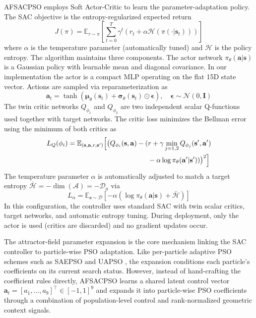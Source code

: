 \documentclass[final,5p,times]{elsarticle}
\newcommand{\symActiondim}{\mathcal{D}_a}
\newcommand{\symGamma}{\gamma}
\begin{document}
AFSACPSO employs Soft Actor-Critic \cite{Haarnoja2018Soft} to learn the parameter-adaptation policy.
The SAC objective is the entropy-regularized expected return
\begin{equation}
J(\pi) = \mathbb{E}_{\tau \sim \pi}\left[\sum_{t=0}^{T} \gamma^t \left(r_t + \alpha \mathcal{H}(\pi(\cdot|\mathbf{s}_t))\right)\right]
\label{eq:sac_objective}
\end{equation} where $\alpha$ is the temperature parameter (automatically tuned) and $\mathcal{H}$ is the policy entropy.
The algorithm maintains three components. The actor network $\pi_\theta(\mathbf{a}|\mathbf{s})$ is a Gaussian policy with learnable mean and diagonal covariance. In our implementation the actor is a compact MLP operating on the flat 15D state vector. Actions are sampled via reparameterization as
\begin{equation}
\mathbf{a}_t = \tanh(\boldsymbol{\mu}_\theta(\mathbf{s}_t) + \boldsymbol{\sigma}_\theta(\mathbf{s}_t) \odot \boldsymbol{\epsilon}), \quad \boldsymbol{\epsilon} \sim \mathcal{N}(0, \mathbf{I})
\end{equation} The twin critic networks $Q_{\phi_1}$ and $Q_{\phi_2}$ are two independent scalar Q-functions used together with target networks. The critic loss minimizes the Bellman error using the minimum of both critics as
\begin{equation}
\begin{aligned}
L_Q(\phi_i) = \mathbb{E}_{(\mathbf{s},\mathbf{a},r,\mathbf{s}')} \Bigl[ \bigl(Q_{\phi_i}(\mathbf{s}, \mathbf{a}) - (&r + \symGamma \min_{j=1,2} Q_{\phi_j}(\mathbf{s}', \mathbf{a}') \\
&- \alpha \log \pi_\theta(\mathbf{a}'|\mathbf{s}') )\bigr)^2 \Bigr]
\end{aligned}
\end{equation} The temperature parameter $\alpha$ is automatically adjusted to match a target entropy $\bar{\mathcal{H}} = -\dim(\mathcal{A}) = -\symActiondim$ via
\begin{equation}
L_\alpha = \mathbb{E}_{\mathbf{s} \sim \mathcal{D}}\left[-\alpha \left(\log \pi_\theta(\mathbf{a}|\mathbf{s}) + \bar{\mathcal{H}}\right)\right]
\end{equation} In this configuration, the controller uses standard SAC with twin scalar critics, target networks, and automatic entropy tuning.
During deployment, only the actor is used (critics are discarded) and no gradient updates occur.

The attractor-field parameter expansion is the core mechanism linking the SAC controller to particle-wise PSO adaptation.
Like per-particle adaptive PSO schemes such as SAEPSO and UAPSO \cite{Liu2025A, Isiet2019Selfadapting}, the expansion conditions each particle's coefficients on its current search status.
However, instead of hand-crafting the coefficient rules directly, AFSACPSO learns a shared latent control vector $\mathbf{a}_t = [a_1,\dots,a_9]^\top \in [-1,1]^9$ and expands it into particle-wise PSO coefficients through a combination of population-level control and rank-normalized geometric context signals.
\end{document}
